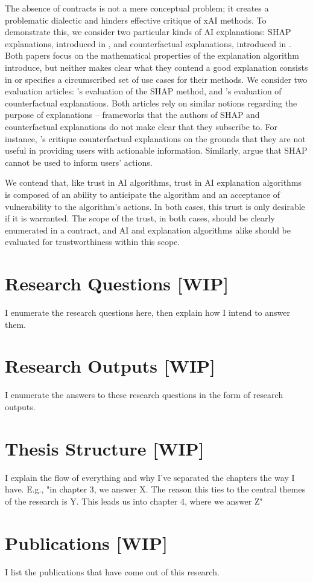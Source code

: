 The absence of contracts is not a mere conceptual problem; it creates a problematic dialectic and hinders effective critique of xAI methods. To demonstrate this, we consider two particular kinds of AI explanations: SHAP explanations, introduced in \textcite{lundberg_unified_2017}, and counterfactual explanations, introduced in \textcite{wachter_counterfactual_2017}. Both papers focus on the mathematical properties of the explanation algorithm introduce, but neither makes clear what they contend a good explanation consists in or specifies a circumscribed set of use cases for their methods. We consider two evaluation articles: \textcite{kumar_problems_2020}'s evaluation of the SHAP method, and \textcite{barocas_hidden_2020}'s evaluation of counterfactual explanations. Both articles rely on similar notions regarding the purpose of explanations – frameworks that the authors of SHAP and counterfactual explanations do not make clear that they subscribe to. For instance, \textcite{barocas_hidden_2020}'s critique counterfactual explanations on the grounds that they are not useful in providing users with actionable information. Similarly, \textcite{kumar_problems_2020} argue that SHAP cannot be used to inform users' actions.

We contend that, like trust in AI algorithms, trust in AI explanation algorithms is composed of an ability to anticipate the algorithm and an acceptance of vulnerability to the algorithm's actions. In both cases, this trust is only desirable if it is warranted. The scope of the trust, in both cases, should be clearly enumerated in a contract, and AI and explanation algorithms alike should be evaluated for trustworthiness within this scope.

\section{Research Questions [WIP]}
I enumerate the research questions here, then explain how I intend to answer them.

\section{Research Outputs [WIP]}
I enumerate the answers to these research questions in the form of research outputs.

\section{Thesis Structure [WIP]}
I explain the flow of everything and why I've separated the chapters the way I have. E.g., "in chapter 3, we answer X. The reason this ties to the central themes of the research is Y. This leads us into chapter 4, where we answer Z"

\section{Publications [WIP]}
I list the publications that have come out of this research.